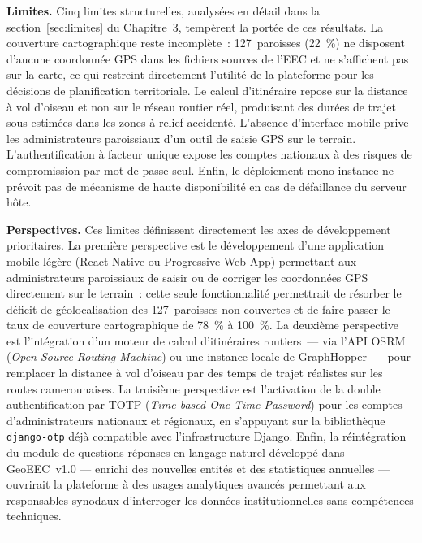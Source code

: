 \medskip
\noindent\textbf{Limites.}
Cinq limites structurelles, analysées en détail dans la
section~\ref{sec:limites} du Chapitre~3, tempèrent la portée de ces
résultats. La couverture cartographique reste incomplète~: 127~paroisses
(22~\%) ne disposent d'aucune coordonnée GPS dans les fichiers sources de
l'EEC et ne s'affichent pas sur la carte, ce qui restreint directement
l'utilité de la plateforme pour les décisions de planification territoriale.
Le calcul d'itinéraire repose sur la distance à vol d'oiseau et non sur
le réseau routier réel, produisant des durées de trajet sous-estimées dans
les zones à relief accidenté. L'absence d'interface mobile prive les
administrateurs paroissiaux d'un outil de saisie GPS sur le terrain.
L'authentification à facteur unique expose les comptes nationaux à des
risques de compromission par mot de passe seul. Enfin, le déploiement
mono-instance ne prévoit pas de mécanisme de haute disponibilité en cas
de défaillance du serveur hôte.

\medskip
\noindent\textbf{Perspectives.}
Ces limites définissent directement les axes de développement prioritaires.
La première perspective est le développement d'une application mobile
légère (React Native ou Progressive Web App) permettant aux administrateurs
paroissiaux de saisir ou de corriger les coordonnées GPS directement sur le
terrain~: cette seule fonctionnalité permettrait de résorber le déficit de
géolocalisation des 127~paroisses non couvertes et de faire passer le taux
de couverture cartographique de 78~\% à 100~\%. La deuxième perspective est
l'intégration d'un moteur de calcul d'itinéraires routiers~--- via l'API
OSRM (\textit{Open Source Routing Machine}) ou une instance locale de
GraphHopper~--- pour remplacer la distance à vol d'oiseau par des temps de
trajet réalistes sur les routes camerounaises. La troisième perspective est
l'activation de la double authentification par TOTP (\textit{Time-based
One-Time Password}) pour les comptes d'administrateurs nationaux et
régionaux, en s'appuyant sur la bibliothèque \texttt{django-otp}
déjà compatible avec l'infrastructure Django. Enfin, la réintégration
du module de questions-réponses en langage naturel développé dans
GeoEEC~v1.0 --- enrichi des nouvelles entités et des statistiques annuelles
--- ouvrirait la plateforme à des usages analytiques avancés permettant
aux responsables synodaux d'interroger les données institutionnelles sans
compétences techniques.

\noindent\rule{\linewidth}{0.8pt}
